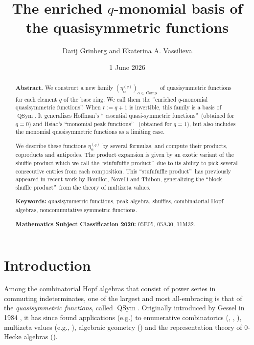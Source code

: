 \documentclass[numbers=enddot,12pt,final,onecolumn,notitlepage]{scrartcl}%
\theoremstyle{definition}
\begin{document}
\title{The enriched $q$-monomial basis of the quasisymmetric functions}
\author{Darij Grinberg and Ekaterina A. Vassilieva}
\date{1 June 2026}
\maketitle

\begin{abstract}
\textbf{Abstract.} We construct a new family $\left(  \eta_{\alpha}^{\left(
q\right)  }\right)  _{\alpha\in\operatorname*{Comp}}$ of quasisymmetric
functions for each element $q$ of the base ring. We call them the
\textquotedblleft enriched $q$-monomial quasisymmetric
functions\textquotedblright. When $r:=q+1$ is invertible, this family is a
basis of $\operatorname*{QSym}$. It generalizes Hoffman's \textquotedblleft
essential quasi-symmetric functions\textquotedblright\ (obtained for $q=0$)
and Hsiao's \textquotedblleft monomial peak functions\textquotedblright%
\ (obtained for $q=1$), but also includes the monomial quasisymmetric
functions as a limiting case.

We describe these functions $\eta_{\alpha}^{\left(  q\right)  }$ by several
formulas, and compute their products, coproducts and antipodes. The product
expansion is given by an exotic variant of the shuffle product which we call
the \textquotedblleft stufufuffle product\textquotedblright\ due to its
ability to pick several consecutive entries from each composition. This
\textquotedblleft stufufuffle product\textquotedblright\ has previously
appeared in recent work by Bouillot, Novelli and Thibon, generalizing the
\textquotedblleft block shuffle product\textquotedblright\ from the theory of
multizeta values. \medskip

\textbf{Keywords:} quasisymmetric functions, peak algebra, shuffles,
combinatorial Hopf algebras, noncommutative symmetric functions.

\textbf{Mathematics Subject Classification 2020:} 05E05, 05A30, 11M32.

\end{abstract}
\tableofcontents

\section{\label{sec.intro}Introduction}

Among the combinatorial Hopf algebras that consist of power series in
commuting indeterminates, one of the largest and most all-embracing is that of
the \textit{quasisymmetric functions}, called $\operatorname*{QSym}$.
Originally introduced by Gessel in 1984 \cite{Gessel84}, it has since found
applications (e.g.) to enumerative combinatorics (\cite[Chapter 8]{Sagan20},
\cite[\S 7.19--7.23]{Stanley-EC2}, \cite{GesZhu18}), multizeta values (e.g.,
\cite{Hoffma15}), algebraic geometry (\cite{Oesing18}) and the representation
theory of $0$-Hecke algebras (\cite[\S 6.2]{Meliot17}).
\end{document}
